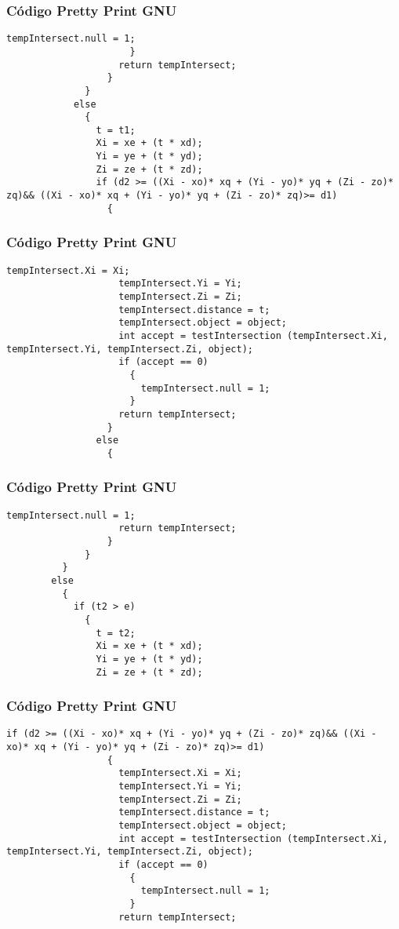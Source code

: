 \documentclass{beamer}
\begin{document}
\begin{frame}[fragile]
\frametitle{C\'odigo Pretty Print GNU}
\begin{lstlisting}[style=CStyle]
                        tempIntersect.null = 1;
                      }
                    return tempIntersect;
                  }
              }
            else
              {
                t = t1;
                Xi = xe + (t * xd);
                Yi = ye + (t * yd);
                Zi = ze + (t * zd);
                if (d2 >= ((Xi - xo)* xq + (Yi - yo)* yq + (Zi - zo)* zq)&& ((Xi - xo)* xq + (Yi - yo)* yq + (Zi - zo)* zq)>= d1)
                  {
                    \end{lstlisting}
\end{frame}
\begin{frame}[fragile]
\frametitle{C\'odigo Pretty Print GNU}
\begin{lstlisting}[style=CStyle]
                    tempIntersect.Xi = Xi;
                    tempIntersect.Yi = Yi;
                    tempIntersect.Zi = Zi;
                    tempIntersect.distance = t;
                    tempIntersect.object = object;
                    int accept = testIntersection (tempIntersect.Xi, tempIntersect.Yi, tempIntersect.Zi, object);
                    if (accept == 0)
                      {
                        tempIntersect.null = 1;
                      }
                    return tempIntersect;
                  }
                else
                  {
                    \end{lstlisting}
\end{frame}
\begin{frame}[fragile]
\frametitle{C\'odigo Pretty Print GNU}
\begin{lstlisting}[style=CStyle]
                    tempIntersect.null = 1;
                    return tempIntersect;
                  }
              }
          }
        else
          {
            if (t2 > e)
              {
                t = t2;
                Xi = xe + (t * xd);
                Yi = ye + (t * yd);
                Zi = ze + (t * zd);
\end{lstlisting}
\end{frame}
\begin{frame}[fragile]
\frametitle{C\'odigo Pretty Print GNU}
\begin{lstlisting}[style=CStyle]
                if (d2 >= ((Xi - xo)* xq + (Yi - yo)* yq + (Zi - zo)* zq)&& ((Xi - xo)* xq + (Yi - yo)* yq + (Zi - zo)* zq)>= d1)
                  {
                    tempIntersect.Xi = Xi;
                    tempIntersect.Yi = Yi;
                    tempIntersect.Zi = Zi;
                    tempIntersect.distance = t;
                    tempIntersect.object = object;
                    int accept = testIntersection (tempIntersect.Xi, tempIntersect.Yi, tempIntersect.Zi, object);
                    if (accept == 0)
                      {
                        tempIntersect.null = 1;
                      }
                    return tempIntersect;
\end{lstlisting}
\end{frame}
\end{document}
